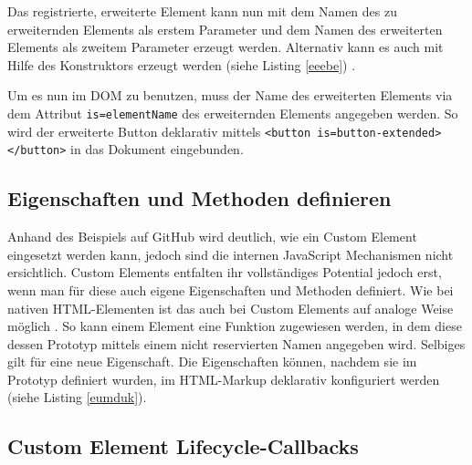

Das registrierte, erweiterte Element kann nun mit dem Namen des zu erweiternden Elements als erstem Parameter und dem Namen des erweiterten Elements als zweitem Parameter erzeugt werden. Alternativ kann es auch mit Hilfe des Konstruktors erzeugt werden (siehe Listing \ref{eeebe}) \cite{citeulike:13752379}.



Um es nun im \ac{DOM} zu benutzen, muss der Name des erweiterten Elements via dem Attribut \texttt{is=\dq elementName\dq} des erweiternden Elements angegeben werden. So wird der erweiterte Button deklarativ mittels \texttt{\textless{}button\ is=\dq button-extended\dq\textgreater{}\textless{}/button\textgreater{}} in das Dokument eingebunden.


\subsection{Eigenschaften und Methoden definieren}\label{eigenschaften-und-methoden-definieren}

Anhand des Beispiels auf GitHub wird deutlich, wie ein Custom Element eingesetzt werden kann, jedoch sind die internen JavaScript Mechanismen nicht ersichtlich. Custom Elements entfalten ihr vollständiges Potential jedoch erst, wenn man für diese auch eigene Eigenschaften und Methoden definiert. Wie bei nativen \ac{HTML}-Elementen ist das auch bei Custom Elements auf analoge Weise möglich \cite[S. 127-138]{citeulike:13844975}. So kann einem Element eine Funktion zugewiesen werden, in dem diese dessen Prototyp mittels einem nicht reservierten Namen angegeben wird. Selbiges gilt für eine neue Eigenschaft. Die Eigenschaften können, nachdem sie im Prototyp definiert wurden, im \ac{HTML}-Markup deklarativ konfiguriert werden (siehe Listing \ref{eumduk}).




\subsection{Custom Element Lifecycle-Callbacks}\label{custom-element-lifecycle-callbacks}

